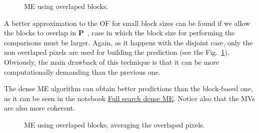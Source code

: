 \begin{figure}
  \centering
  \caption{ME using overlaped blocks.}
  \label{fig:overlaped}
\end{figure}

A better approximation to the OF for small block sizes can be found if
we allow the blocks to overlap in ${\mathbf
  P}$~\cite{orchard1994overlapped}, case in which the block size for
performing the comparisons must be larger. Again, as it happens with
the disjoint case, only the non overlaped pixels are used for building
the prediction (see the Fig.~\ref{fig:overlaped}). Obviously, the main
drawback of this technique is that it can be more computationally
demanding than the previous one.

\begin{comment}
\begin{figure}
  \centering
  \png{stockholm_hat_P_dense}{800}
  \caption{The prediction frame (${\hat{\mathbf P}}$). See \href{https://github.com/Sistemas-Multimedia/Sistemas-Multimedia.github.io/blob/master/milestones/09-ME/full_search_dense_ME.ipynb}{this}.}
  \label{fig:hat_P_dense}
\end{figure}

\begin{figure}
  \centering
  \png{stockholm_error_dense}{800}
  \caption{The prediction error frame (${\mathbf R} - {\hat{\mathbf P}}$). See \href{https://github.com/Sistemas-Multimedia/Sistemas-Multimedia.github.io/blob/master/milestones/09-ME/full_search_dense_ME.ipynb}{this}.}
  \label{fig:error_dense}
\end{figure}

\begin{figure}
  \centering
  \png{stockholm_MVs_dense}{800}
  \caption{Motion vectors to map ${\mathbf P}$ (from which each pixel has been mapped) onto ${\mathbf R}$. See \href{https://github.com/Sistemas-Multimedia/Sistemas-Multimedia.github.io/blob/master/milestones/09-ME/full_search_dense_ME.ipynb}{this}.}
  \label{fig:MVs_dense}
\end{figure}
\end{comment}

The dense ME algorithm can obtain better predictions than the
block-based one, as it can be seen in the notebook
\href{https://github.com/vicente-gonzalez-ruiz/motion_estimation/blob/main/src/motion_estimation/full_search_dense_ME.ipynb}{Full
  search dense ME}. Notice also that the MVs are also more coherent.

\begin{figure}
  \centering
  \caption{ME using overlaped blocks, averaging the overlaped pixels.}
  \label{fig:average}
\end{figure}

